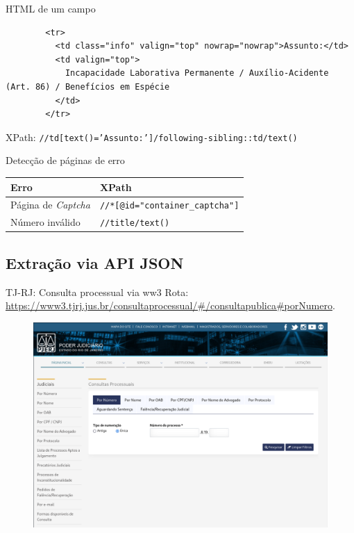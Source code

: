 \begin{frame}[fragile]{HTML de um campo}
    \begin{verbatim}
        <tr>
          <td class="info" valign="top" nowrap="nowrap">Assunto:</td>
          <td valign="top">
            Incapacidade Laborativa Permanente / Auxílio-Acidente (Art. 86) / Benefícios em Espécie
          </td>
        </tr>
    \end{verbatim}

    \vspace{1ex}

    XPath: \texttt{//td[text()='Assunto:']/following-sibling::td/text()}
\end{frame}

\begin{frame}{Detecção de páginas de erro}
    \begin{tabular}{ll}
        \toprule
        Erro & XPath \\
        \midrule
        Página de \textit{Captcha} & \texttt{//*[@id="container_captcha"]} \\
        Número inválido & \texttt{//title/text()} \\
        \bottomrule
    \end{tabular}
\end{frame}

\subsection{Extração via API JSON}

\begin{frame}{TJ-RJ: Consulta processual via ww3}
    \tiny Rota: \url{https://www3.tjrj.jus.br/consultaprocessual/\#/consultapublica\#porNumero}.
    \begin{figure}
        \includegraphics[keepaspectratio,width=0.9\textheight]{img/tj-rj-pagina-consulta-ww3}
    \end{figure}
\end{frame}

